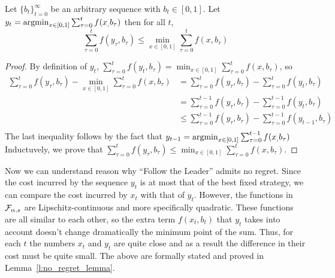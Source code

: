 \begin{lemma}\label{l:y_t}
Let $\{b_t\}_{t=0}^\infty$ be an arbitrary sequence with $b_t \in [0,1]$. Let $y_t = \operatorname*{argmin}_{x \in [0,1]}\sum_{\tau=0}^tf(x_,b_\tau)$
then for all $t$,
\[
\sum_{\tau=0}^t f(y_\tau,b_\tau) \leq \min_{x \in [0,1]}\sum_{\tau = 0}^tf(x,b_\tau)
\]
\end{lemma}

\begin{proof}By definition of $y_t$,
  $\sum_{\tau=0}^t f(y_t,b_\tau)=\min_{ x \in [0,1]} \sum_{\tau=0}^t f(x,b_\tau)$, so
  \begin{align*}
    \sum_{\tau=0}^t f(y_\tau,b_\tau) - \min_{ x \in [0,1]} \sum_{\tau=0}^t f(x,b_\tau) &=
    \sum_{\tau=0}^t f(y_\tau,b_\tau) - \sum_{\tau=0}^t f(y_t,b_\tau)\\
    &= \sum_{\tau=0}^{t-1} f(y_\tau,b_\tau) - \sum_{\tau=0}^{t-1} f(y_t,b_\tau)\\
    &\leq \sum_{\tau=0}^{t-1} f(y_\tau,b_\tau) - \sum_{\tau=0}^{t-1} f(y_{t-1},b_\tau)\\
  \end{align*}
  The last inequality follows by the fact that $y_{t-1} = \operatorname*{argmin}_{x \in [0,1]}\sum_{\tau=0}^{t-1}f(x_,b_\tau)$
  Inductuvely, we prove that $\sum_{\tau=0}^t f(y_\tau,b_\tau) \leq \min_{ x \in [0,1]} \sum_{\tau=0}^t f(x,b_\tau)$.
\end{proof}

Now we can understand reason why \enquote{Follow the Leader}
admits no regret. Since the cost incurred by the sequence $y_t$ is at most that
of the best fixed strategy, we can compare the cost incurred by $x_t$ with
that of $y_t$.  However, the functions in $\mathcal{F}_{\alpha,s}$ are 
Lipschitz-continuous and more specifically quadratic.
These functions are all similar to each other, so the extra 
term $f(x_t,b_t)$ that $y_t$ takes into account doesn't change 
dramatically the minimum point of the sum. Thus, for each $t$ the 
numbers $x_t$ and $y_t$ are quite close and as a result the 
difference in their cost must be quite small. The above are 
formally stated and proved in Lemma~\ref{l:no_regret_lemma}.

